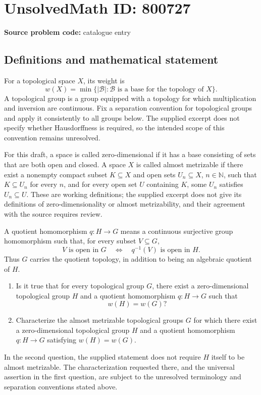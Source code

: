\documentclass[11pt]{article}
\newcommand{\N}{\mathbb{N}}
\begin{document}
\section*{UnsolvedMath ID: 800727}
\textbf{Source problem code:} catalogue entry
\subsection{Definitions and mathematical statement}
For a topological space \(X\), its weight is
\[
w(X)=\min\{\lvert\mathcal B\rvert:\mathcal B\text{ is a base for the topology of }X\}.
\]
A topological group is a group equipped with a topology for which multiplication and inversion are continuous. Fix a separation convention for topological groups and apply it consistently to all groups below. The supplied excerpt does not specify whether Hausdorffness is required, so the intended scope of this convention remains unresolved.

For this draft, a space is called zero-dimensional if it has a base consisting of sets that are both open and closed. A space \(X\) is called almost metrizable if there exist a nonempty compact subset \(K\subseteq X\) and open sets \(U_n\subseteq X\), \(n\in\N\), such that \(K\subseteq U_n\) for every \(n\), and for every open set \(U\) containing \(K\), some \(U_n\) satisfies \(U_n\subseteq U\). These are working definitions; the supplied excerpt does not give its definitions of zero-dimensionality or almost metrizability, and their agreement with the source requires review.

A quotient homomorphism \(q:H\to G\) means a continuous surjective group homomorphism such that, for every subset \(V\subseteq G\),
\[
V\text{ is open in }G\quad\Longleftrightarrow\quad q^{-1}(V)\text{ is open in }H.
\]
Thus \(G\) carries the quotient topology, in addition to being an algebraic quotient of \(H\).

\begin{enumerate}
\item Is it true that for every topological group \(G\), there exist a zero-dimensional topological group \(H\) and a quotient homomorphism \(q:H\to G\) such that
\[
w(H)=w(G)?
\]
\item Characterize the almost metrizable topological groups \(G\) for which there exist a zero-dimensional topological group \(H\) and a quotient homomorphism \(q:H\to G\) satisfying \(w(H)=w(G)\).
\end{enumerate}
In the second question, the supplied statement does not require \(H\) itself to be almost metrizable. The characterization requested there, and the universal assertion in the first question, are subject to the unresolved terminology and separation conventions stated above.
\end{document}
